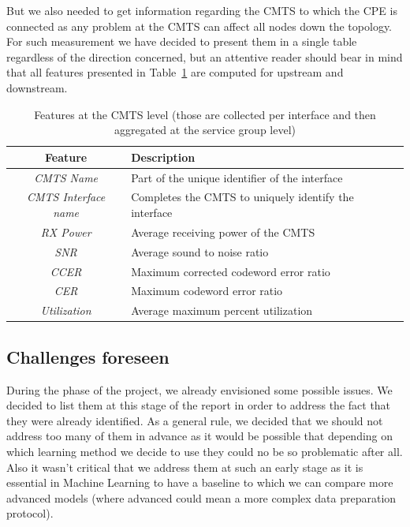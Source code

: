But we also needed to get information regarding the CMTS to which the CPE is connected as any problem at the CMTS can affect all nodes down the topology. For such measurement we have decided to present them in a single table regardless of the direction concerned, but an attentive reader should bear in mind that all features presented in Table~\ref{CMTSMes} are computed for upstream and downstream. 

\begin{table}[h]
\begin{center}
\begin{tabular}{c p{85mm}}
\hline
\textbf{Feature} & \textbf{Description}\\ 
\hline\hline
\textit{CMTS Name} & Part of the unique identifier of the interface\\
\hline
\textit{CMTS Interface name} & Completes the CMTS to uniquely identify the interface\\
\hline
\textit{RX Power} & Average receiving power of the CMTS\\
\hline
\textit{SNR} & Average sound to noise ratio\\
\hline
\textit{CCER} & Maximum corrected codeword error ratio\\
\hline
\textit{CER} & Maximum codeword error ratio\\
\hline
\textit{Utilization} & Average maximum percent utilization\\
\end{tabular}
\end{center}
\caption{\label{CMTSMes}Features at the CMTS level (those are collected per interface and then aggregated at the service group level)}
\end{table}

\subsection{Challenges foreseen}
During the phase of the project, we already envisioned some possible issues. We decided to list them at this stage of the report in order to address the fact that they were already identified. As a general rule, we decided that we should not address too many of them in advance as it would be possible that depending on which learning method we decide to use they could no be so problematic after all. Also it wasn't critical that we address them at such an early stage as it is essential in Machine Learning to have a baseline to which we can compare more advanced models (where advanced could mean a more complex data preparation protocol).

